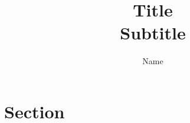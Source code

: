 \documentclass[a4paper,11pt]{article}
\author{Name}
\title{Title \\ Subtitle}
\numberwithin{equation}{section} %
\theoremstyle{definition}
\begin{document}
    \maketitle


    \section{Section}

\end{document}
